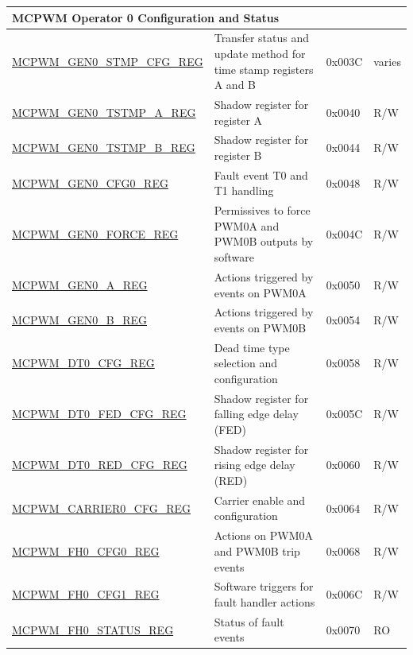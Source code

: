\begin{longtable}{ | p{6cm} | p{7.2cm} | p{1.3cm} | p{1cm} | }
\multicolumn{4}{|l|}{\textbf{MCPWM Operator 0 Configuration and Status}} \\ \hline
\hyperref[regdesc:MCPWMGENNSTMPCFGREG]{MCPWM\_GEN0\_STMP\_CFG\_REG} & Transfer status and update method for time stamp registers A and B & 0x003C & varies \\ \hline
\hyperref[regdesc:MCPWMGENNTSTMPAREG]{MCPWM\_GEN0\_TSTMP\_A\_REG} & Shadow register for register A & 0x0040 & R/W \\ \hline
\hyperref[regdesc:MCPWMGENNTSTMPBREG]{MCPWM\_GEN0\_TSTMP\_B\_REG} & Shadow register for register B & 0x0044 & R/W \\ \hline
\hyperref[regdesc:MCPWMGENNCFG0REG]{MCPWM\_GEN0\_CFG0\_REG} & Fault event T0 and T1 handling & 0x0048 & R/W \\ \hline
\hyperref[regdesc:MCPWMGENNFORCEREG]{MCPWM\_GEN0\_FORCE\_REG} & Permissives to force PWM0A and PWM0B outputs by software & 0x004C & R/W \\ \hline
\hyperref[regdesc:MCPWMGENNAREG]{MCPWM\_GEN0\_A\_REG} & Actions triggered by events on PWM0A & 0x0050 & R/W \\ \hline
\hyperref[regdesc:MCPWMGENNBREG]{MCPWM\_GEN0\_B\_REG} & Actions triggered by events on PWM0B & 0x0054 & R/W \\ \hline
\hyperref[regdesc:MCPWMDTNCFGREG]{MCPWM\_DT0\_CFG\_REG} & Dead time type selection and configuration & 0x0058 & R/W \\ \hline
\hyperref[regdesc:MCPWMDTNFEDCFGREG]{MCPWM\_DT0\_FED\_CFG\_REG} & Shadow register for falling edge delay (FED) & 0x005C & R/W \\ \hline
\hyperref[regdesc:MCPWMDTNREDCFGREG]{MCPWM\_DT0\_RED\_CFG\_REG} & Shadow register for rising edge delay (RED) & 0x0060 & R/W \\ \hline
\hyperref[regdesc:MCPWMCARRIERNCFGREG]{MCPWM\_CARRIER0\_CFG\_REG} & Carrier enable and configuration & 0x0064 & R/W \\ \hline
\hyperref[regdesc:MCPWMFHNCFG0REG]{MCPWM\_FH0\_CFG0\_REG} & Actions on PWM0A and PWM0B trip events & 0x0068 & R/W \\ \hline
\hyperref[regdesc:MCPWMFHNCFG1REG]{MCPWM\_FH0\_CFG1\_REG} & Software triggers for fault handler actions & 0x006C & R/W \\ \hline
\hyperref[regdesc:MCPWMFHNSTATUSREG]{MCPWM\_FH0\_STATUS\_REG} & Status of fault events & 0x0070 & RO \\ \hline


\end{longtable}
